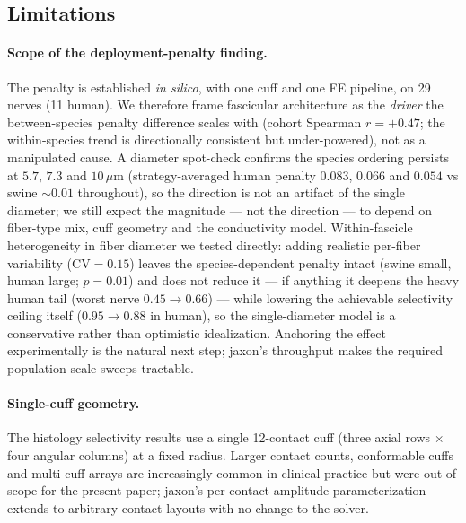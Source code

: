 \subsection{Limitations}
\label{sec:limitations}

\paragraph{Scope of the deployment-penalty finding.}
The penalty is established \emph{in silico}, with one cuff and one FE
pipeline, on 29 nerves (11 human).  We therefore frame fascicular
architecture as the \emph{driver} the between-species penalty difference
scales with (cohort Spearman $r = +0.47$; the within-species trend is
directionally consistent but under-powered), not as a manipulated cause.
A diameter spot-check confirms the species ordering persists at $5.7$,
$7.3$ and $10\,\mu\mathrm{m}$ (strategy-averaged human penalty $0.083$,
$0.066$ and $0.054$ vs swine ${\sim}0.01$ throughout), so the direction
is not an artifact of the single diameter; we still expect the magnitude
--- not the direction --- to depend on fiber-type mix, cuff geometry and
the conductivity model.  Within-fascicle heterogeneity in fiber diameter
we tested directly: adding realistic per-fiber variability
($\mathrm{CV}=0.15$) leaves the species-dependent penalty intact (swine
small, human large; $p=0.01$) and does not reduce it --- if anything it
deepens the heavy human tail (worst nerve $0.45\rightarrow0.66$) --- while
lowering the achievable selectivity ceiling itself ($0.95\rightarrow0.88$
in human), so the single-diameter model is a conservative rather than
optimistic idealization.  Anchoring the effect experimentally is the
natural next step; jaxon's throughput makes the required population-scale
sweeps tractable.

\paragraph{Single-cuff geometry.}
The histology selectivity results use a single 12-contact
cuff (three axial rows $\times$ four angular columns) at a fixed
radius.  Larger contact counts, conformable cuffs and multi-cuff
arrays are increasingly common in clinical practice but were out of
scope for the present paper; jaxon's per-contact amplitude
parameterization extends to arbitrary contact layouts with no change
to the solver.

